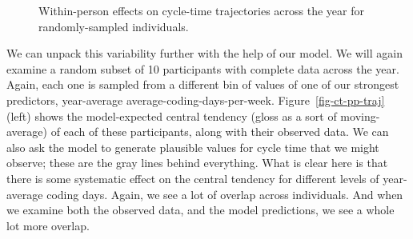 \documentclass[manuscript,screen,review]{acmart}
\begin{document}
\begin{figure}


\caption[Within-person effects on cycle-time
trajectories]{\label{fig-wi-ct-traj}Within-person effects on cycle-time
trajectories across the year for randomly-sampled individuals.}

\end{figure}%

We can unpack this variability further with the help of our model. We
will again examine a random subset of 10 participants with complete data
across the year. Again, each one is sampled from a different bin of
values of one of our strongest predictors, year-average
average-coding-days-per-week. Figure~\ref{fig-ct-pp-traj} (left) shows
the model-expected central tendency (gloss as a sort of moving-average)
of each of these participants, along with their observed data. We can
also ask the model to generate plausible values for cycle time that we
might observe; these are the gray lines behind everything. What is clear
here is that there is some systematic effect on the central tendency for
different levels of year-average coding days. Again, we see a lot of
overlap across individuals. And when we examine both the observed data,
and the model predictions, we see a whole lot more overlap.
\end{document}
